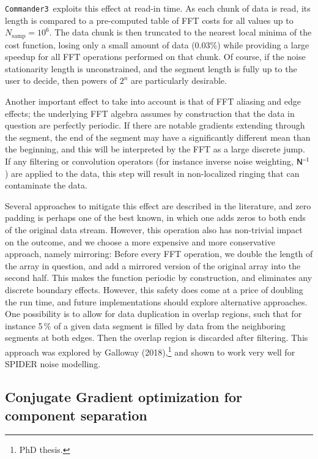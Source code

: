 \documentclass[twocolumn]{aa}
\def\commanderthree{\texttt{Commander3}}
\newcommand{\N}[0]{\tens{N}}
\begin{document}
\commanderthree\ exploits this effect at read-in time. As each chunk
of data is read, its length is compared to a pre-computed table of FFT
costs for all values up to $N_{\mathrm{samp}} = 10^6$. The data chunk
is then truncated to the nearest local minima of the cost function,
losing only a small amount of data (0.03\%) while providing a large
speedup for all FFT operations performed on that chunk. Of course, if
the noise stationarity length is unconstrained, and the segment length
is fully up to the user to decide, then powers of $2^{n}$ are
particularly desirable.

Another important effect to take into account is that of FFT aliasing
and edge effects; the underlying FFT algebra assumes by construction
that the data in question are perfectly periodic. If there are notable
gradients extending through the segment, the end of the segment may
have a significantly different mean than the beginning, and this will
be interpreted by the FFT as a large discrete jump. If any filtering
or convolution operators (for instance inverse noise weighting,
$\N^{-1}$) are applied to the data, this step will result in
non-localized ringing that can contaminate the data.

Several approaches to mitigate this effect are described in the
literature, and zero padding is perhaps one of the best known, in
which one adds zeros to both ends of the original data
stream. However, this operation also has non-trivial impact on the
outcome, and we choose a more expensive and more conservative
approach, namely mirroring: Before every FFT operation, we double the
length of the array in question, and add a mirrored version of the
original array into the second half. This makes the function periodic
by construction, and eliminates any discrete boundary
effects. However, this safety does come at a price of doubling the run
time, and future implementations should explore alternative
approaches. One possibility is to allow for data duplication in
overlap regions, such that for instance 5\,\% of a given data segment
is filled by data from the neighboring segments at both edges. Then
the overlap region is discarded after filtering. This approach was
explored by Galloway (2018),\footnote{PhD thesis.} and shown to work
very well for SPIDER noise modelling.

\subsection{Conjugate Gradient optimization for component separation}
\label{sec:cg}
\end{document}

